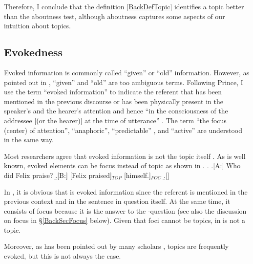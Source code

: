 Therefore, I conclude that
the definition \ref{BackDefTopic} identifies a topic
better than the aboutness test,
although aboutness captures some aspects of our intuition about topics.


\subsection{Evokedness}\label{BackEvoked}

Evoked information is commonly called ``given'' or ``old'' information.
However, as pointed out in ,
``given'' and ``old'' are too ambiguous terms.
Following Prince,
I use the term ``evoked information'' to indicate the referent that has been mentioned in the previous discourse or has been physically present in the speaker's and the hearer's attention
and hence ``in the consciousness of the addressee [(or the hearer)] at the time of utterance'' \cite[p.~30]{chafe76}.
The term ``the focus (center) of attention'', ``anaphoric'', ``predictable'' \cite{kuno72}, and ``active'' \cite{portner07} are understood in the same way.

Most researchers agree that evoked information is not the topic itself \cite[]{reinhart81,gundel88,lambrecht94}.
As is well known, evoked elements can be focus instead of topic as shown in \Next[B].
%
\ex.\label{BackExHimself} \a.[A:] Who did Felix praise?
     \b.[B:] [Felix praised]$_{TOP}$ [himself.]$_{FOC}$
     \b.[] \hfill{\cite[p.~72, style modified by the current author]{reinhart81}}

In \Last[B], it is obvious that  is evoked information
since the referent is mentioned in the previous context and in the sentence in question itself.
At the same time, it consists of focus because
it is the answer to the -question (see also the discussion on focus in \S \ref{BackSecFocus} below).
Given that foci cannot be topics,
 in \Last[B] is not a topic.

Moreover, as has been pointed out by many scholars \cite[see][]{li76,givon83,halliday04},
topics are frequently evoked, but this is not always the case.


%
%
%

